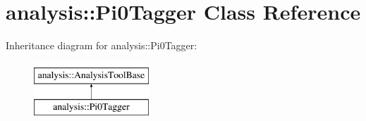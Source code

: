 \hypertarget{classanalysis_1_1Pi0Tagger}{}\section{analysis\+:\+:Pi0\+Tagger Class Reference}
\label{classanalysis_1_1Pi0Tagger}
Inheritance diagram for analysis\+:\+:Pi0\+Tagger\+:\begin{figure}[H]
\begin{center}
\leavevmode
\includegraphics[height=2.000000cm]{classanalysis_1_1Pi0Tagger}
\end{center}
\end{figure}
